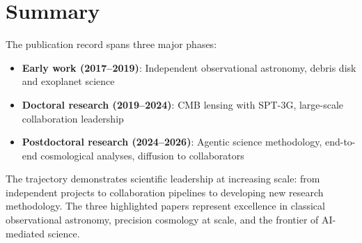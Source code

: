 \documentclass[11pt,a4paper]{article}
\begin{document}
\section*{Summary}

The publication record spans three major phases:
\begin{itemize}
\item \textbf{Early work (2017--2019)}: Independent observational astronomy, debris disk and exoplanet science
\item \textbf{Doctoral research (2019--2024)}: CMB lensing with SPT-3G, large-scale collaboration leadership
\item \textbf{Postdoctoral research (2024--2026)}: Agentic science methodology, end-to-end cosmological analyses, diffusion to collaborators
\end{itemize}

The trajectory demonstrates scientific leadership at increasing scale: from independent projects to collaboration pipelines to developing new research methodology. The three highlighted papers represent excellence in classical observational astronomy, precision cosmology at scale, and the frontier of AI-mediated science.
\end{document}
